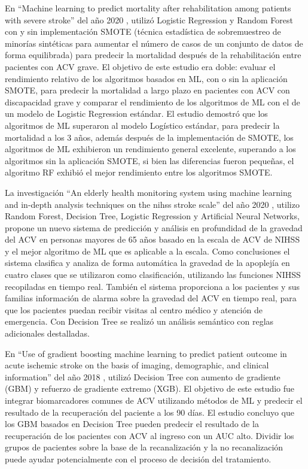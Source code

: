 \par En “Machine learning to predict mortality after rehabilitation among patients with severe stroke” del año 2020 \cite{Scrutinio2020}, utilizó Logistic Regression y Random Forest con y sin implementación SMOTE (técnica estadística de sobremuestreo de minorías sintéticas para aumentar el número de casos de un conjunto de datos de forma equilibrada) para predecir la mortalidad después de la rehabilitación entre pacientes con ACV grave. El objetivo de este estudio era doble: evaluar el rendimiento relativo de los algoritmos basados en ML, con o sin la aplicación SMOTE, para predecir la mortalidad a largo plazo en pacientes con ACV con discapacidad grave y comparar el rendimiento de los algoritmos de ML con el de un modelo de Logistic Regression estándar. El estudio demostró que los algoritmos de ML superaron al modelo Logístico estándar, para predecir la mortalidad a los 3 años, además después de la implementación de SMOTE, los algoritmos de ML exhibieron un rendimiento general excelente, superando a los algoritmos sin la aplicación SMOTE, si bien las diferencias fueron pequeñas, el algoritmo RF exhibió el mejor rendimiento entre los algoritmos SMOTE.\\

\par La investigación “An elderly health monitoring system using machine learning and in-depth analysis techniques on the nihss stroke scale” del año 2020 \cite{Yu2020}, utilizo Random Forest, Decision Tree, Logistic Regression y Artificial Neural Networks, propone un nuevo sistema de predicción y análisis en profundidad de la gravedad del ACV en personas mayores de 65 años basado en la escala de ACV de NIHSS y el mejor algoritmo de ML que es aplicable a la escala. Como conclusiones el sistema clasifica y analiza de forma automática la gravedad de la apoplejía en cuatro clases que se utilizaron como clasificación, utilizando las funciones NIHSS recopiladas en tiempo real. También el sistema proporciona a los pacientes y sus familias información de alarma sobre la gravedad del ACV en tiempo real, para que los pacientes puedan recibir visitas al centro médico y atención de emergencia. Con Decision Tree se realizó un análisis semántico con reglas adicionales destalladas.\\

\par En “Use of gradient boosting machine learning to predict patient outcome in acute ischemic stroke on the basis of imaging, demographic, and clinical information” del año 2018 \cite{Xie2018}, utilizó Decision Tree con aumento de gradiente (GBM) y refuerzo de gradiente extremo (XGB). El objetivo de este estudio fue integrar biomarcadores comunes de ACV utilizando métodos de ML y predecir el resultado de la recuperación del paciente a los 90 días. El estudio concluyo que los GBM basados en Decision Tree pueden predecir el resultado de la recuperación de los pacientes con ACV al ingreso con un AUC alto. Dividir los grupos de pacientes sobre la base de la recanalización y la no recanalización puede ayudar potencialmente con el proceso de decisión del tratamiento.\\

